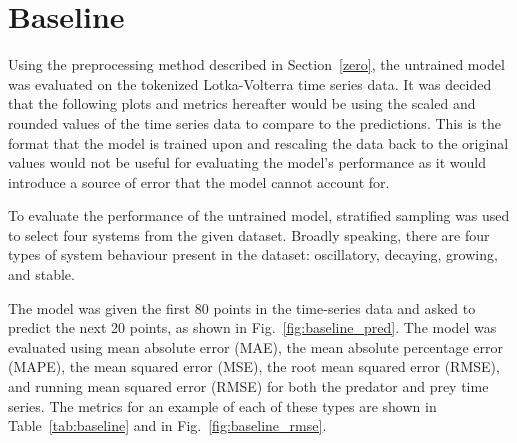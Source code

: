 \documentclass[11pt,a4paper]{article}
\begin{document}
\section{Baseline}
\label{sec:baseline}
Using the preprocessing method described in Section~\ref{zero}, the untrained model was evaluated on the tokenized Lotka-Volterra time series data. It was decided that the following plots and metrics hereafter would be using the scaled and rounded values of the time series data to compare to the predictions. This is the format that the model is trained upon and rescaling the data back to the original values would not be useful for evaluating the model's performance as it would introduce a source of error that the model cannot account for.

To evaluate the performance of the untrained model, stratified sampling was used to select four systems from the given dataset. Broadly speaking, there are four types of system behaviour present in the dataset: oscillatory, decaying, growing, and stable. 

The model was given the first 80 points in the time-series data and asked to predict the next 20 points, as shown in Fig.~\ref{fig:baseline_pred}. The model was evaluated using mean absolute error (MAE), the mean absolute percentage error (MAPE), the mean squared error (MSE), the root mean squared error (RMSE), and running mean squared error (RMSE) for both the predator and prey time series. The metrics for an example of each of these types are shown in Table~\ref{tab:baseline} and in Fig.~\ref{fig:baseline_rmse}.
\end{document}
